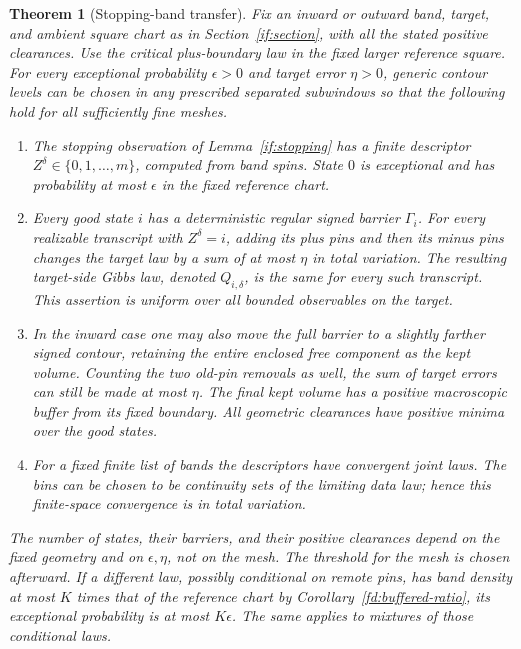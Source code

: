 \documentclass[11pt]{article}
\newtheorem{theorem}{Theorem}[section]
\theoremstyle{definition}
\theoremstyle{remark}
\numberwithin{equation}{section}
\begin{document}
\begin{theorem}[Stopping-band transfer]\label{if:band-transfer}
Fix an inward or outward band, target, and ambient square chart as in
Section~\ref{if:section}, with all the stated positive clearances.
Use the critical plus-boundary law in the fixed larger reference square.
For every exceptional probability
$\epsilon>0$ and target error $\eta>0$, generic contour levels can be
chosen in any prescribed separated subwindows so that the following
hold for all sufficiently fine meshes.
\begin{enumerate}
\item The stopping observation of Lemma~\ref{if:stopping} has a finite
      descriptor $Z^\delta\in\{0,1,\ldots,m\}$, computed from band
      spins.  State $0$ is exceptional and has probability at most
      $\epsilon$ in the fixed reference chart.
\item Every good state $i$ has a deterministic regular signed barrier
      $\Gamma_i$.  For every realizable transcript with $Z^\delta=i$,
      adding its plus pins and then its minus pins changes the target
      law by a sum of at most $\eta$ in total variation.  The resulting
      target-side Gibbs law, denoted $Q_{i,\delta}$, is the same for
      every such transcript.  This assertion is uniform over all
      bounded observables on the target.
\item In the inward case one may also move the full barrier to a
      slightly farther signed contour, retaining the entire enclosed
      free component as the kept volume.  Counting the two old-pin
      removals as well, the sum of target errors can still be made
      at most $\eta$.  The final kept volume has a positive
      macroscopic buffer from its fixed boundary.  All geometric
      clearances have positive minima over the good states.
\item For a fixed finite list of bands the descriptors have convergent
      joint laws.  The bins can be chosen to be continuity sets of
      the limiting data law; hence this finite-space convergence is
      in total variation.
\end{enumerate}
The number of states, their barriers, and their positive clearances
depend on the fixed geometry and on $\epsilon,\eta$, not on the mesh.
The threshold for the mesh is chosen afterward.  If a different law,
possibly conditional on remote pins, has band density at most $K$
times that of the reference chart by
Corollary~\ref{fd:buffered-ratio}, its exceptional probability is at most
$K\epsilon$.  The same applies to mixtures of those conditional laws.
\end{theorem}
\end{document}

